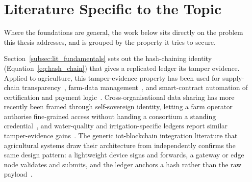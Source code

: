 \documentclass[12pt,a4paper,oneside]{book}
\begin{document}
\section{Literature Specific to the Topic}
\label{sec:lit_specific_topic}

Where the foundations are general, the work below sits directly on the
problem this thesis addresses, and is grouped by the property it tries to
secure.

\label{subsec:lit_blockchain_ag}

Section~\ref{subsec:lit_fundamentals} sets out the hash-chaining identity
(Equation~\ref{eq:hash_chain}) that gives a replicated ledger its tamper
evidence. Applied to agriculture, this tamper-evidence property has been
used for supply-chain
transparency~\cite{tian2016agri, kamilaris2019rise, oh2025foodsafety, galvez2018future, tian2017traceability, reyna2018blockchain, tian2017agri, anonndsupplychain}, farm-data
management~\cite{lin2018blockchain, ferrag2020security, haque2024scalable, zhang2019blockchain, ali2023farmDataTampering}, and smart-contract
automation of certification and payment
logic~\cite{rama2021systematic, patil2022blockchain, nguyen2022smartFarmingSC, tian2017agri}. Cross-organisational data
sharing has more recently been framed through self-sovereign identity,
letting a farm operator authorise fine-grained access without handing a
consortium a standing credential~\cite{amraouy2025ssi}, and water-quality
and irrigation-specific ledgers report similar tamper-evidence
gains~\cite{saito2025blockchainWaterQuality, arshad2022blockchainBenefits, ali2023farmDataTampering, rahman2019agriSecurity}. The generic \gls{iot}-blockchain integration
literature that agricultural systems draw their architecture from
independently confirms the same design pattern: a lightweight device signs
and forwards, a gateway or edge node validates and submits, and the ledger
anchors a hash rather than the raw
payload~\cite{dorri2017blockchain, nguyen2019blockchain, xu2020making, reyna2018blockchain, benedict2021decentralized}.
\end{document}
